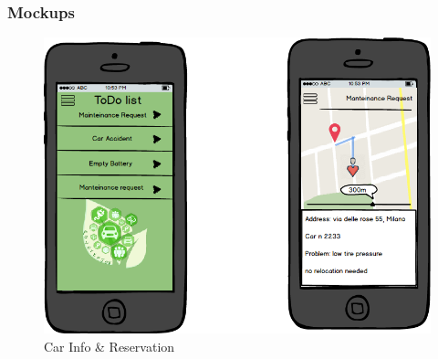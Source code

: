 \documentclass[english]{article}
\begin{document}
			\subsubsection{Mockups}	
				\begin{figure}[H]
					\centering
					\includegraphics[scale=0.4]{./Mockups/FieldStaff/FieldStaff.png}%
					\caption{Car Info \& Reservation}
				\end{figure}
\end{document}
